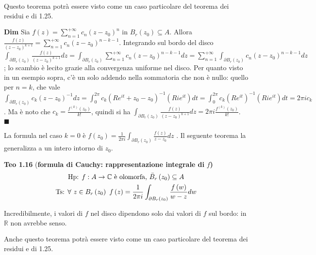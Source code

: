 \documentclass{article}
\begin{document}
Questo teorema potr\`{a} essere visto come un caso particolare del teorema
dei residui e di 1.25.

\textbf{Dim} Sia $f\left( z\right) =\sum_{n=1}^{+\infty }c_{n}\left(
z-z_{0}\right) ^{n}$ in $B_{r}\left( z_{0}\right) \subseteq A$. Allora $%
\frac{f\left( z\right) }{\left( z-z_{0}\right) ^{k+1}}=\sum_{n=1}^{+\infty
}c_{n}\left( z-z_{0}\right) ^{n-k-1}$. Integrando sul bordo del disco $%
\int_{\partial B_{r}\left( z_{0}\right) }\frac{f\left( z\right) }{\left(
z-z_{0}\right) ^{k+1}}dz=\int_{\partial B_{r}\left( z_{0}\right)
}\sum_{n=1}^{+\infty }c_{n}\left( z-z_{0}\right)
^{n-k-1}dz=\sum_{n=1}^{+\infty }\int_{\partial B_{r}\left( z_{0}\right)
}c_{n}\left( z-z_{0}\right) ^{n-k-1}dz$; lo scambio \`{e} lecito grazie alla
convergenza uniforme nel disco. Per quanto visto in un esempio sopra, c'\`{e}
un solo addendo nella sommatoria che non \`{e} nullo: quello per $n=k$, che
vale $\int_{\partial B_{r}\left( z_{0}\right) }c_{k}\left( z-z_{0}\right)
^{-1}dz=\int_{0}^{2\pi }c_{k}\left( Re^{it}+z_{0}-z_{0}\right) ^{-1}\left(
Rie^{it}\right) dt=\int_{0}^{2\pi }c_{k}\left( Re^{it}\right) ^{-1}\left(
Rie^{it}\right) dt=2\pi ic_{k}$. Ma \`{e} noto che $c_{k}=\frac{f^{\left(
k\right) }\left( z_{0}\right) }{k!}$, quindi si ha $\int_{\partial
B_{r}\left( z_{0}\right) }\frac{f\left( z\right) }{\left( z-z_{0}\right)
^{k+1}}dz=2\pi i\frac{f^{\left( k\right) }\left( z_{0}\right) }{k!}$. $%
\blacksquare $

La formula nel caso $k=0$ \`{e} $f\left( z_{0}\right) =\frac{1}{2\pi i}%
\int_{\partial B_{r}\left( z_{0}\right) }\frac{f\left( z\right) }{z-z_{0}}dz$%
. Il seguente teorema la generalizza a un intero intorno di $z_{0}$.

\textbf{Teo 1.16} (\textbf{formula di Cauchy: rappresentazione integrale di }%
$f$\textbf{)}%
\begin{gather*}
\text{Hp: }f:A\rightarrow 
\mathbb{C}
\text{ \`{e} olomorfa, }\bar{B}_{r}\left( z_{0}\right) \subseteq A \\
\text{Ts: }\forall \text{ }z\in B_{r}\left( z_{0}\right) \text{ }f\left(
z\right) =\frac{1}{2\pi i}\int_{\partial B_{r}\left( z_{0}\right) }\frac{%
f\left( w\right) }{w-z}dw
\end{gather*}

Incredibilmente, i valori di $f$ nel disco dipendono solo dai valori di $f$
sul bordo: in $%
\mathbb{R}
$ non avrebbe senso.

Anche questo teorema potr\`{a} essere visto come un caso particolare del
teorema dei residui e di 1.25.
\end{document}
